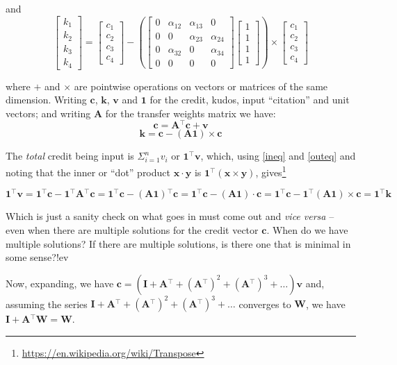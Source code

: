 \documentclass{article}
\newcommand{\cb}{\bm{c}}
\newcommand{\kb}{\bm{k}}
\newcommand{\A}{\bm{A}}
\newcommand{\I}{\bm{I}}
\newcommand{\one}{\bm{1}}
\newcommand{\vb}{\bm{v}}
\newcommand{\W}{\bm{W}}
\newcommand{\tp}[1]{#1\!^{\top}}
\newcommand{\AT}{\tp{\A}}
\begin{document}
and
\[
\left[
  \begin{array}{c}
    k_1 \\ k_2 \\ k_3 \\ k_4
  \end{array}
  \right]
=
\left[
  \begin{array}{c}
    c_1 \\ c_2 \\ c_3 \\ c_4
  \end{array}
  \right]
-
\left(\left[
  \begin{array}{cccc}
    0     & \alpha_{12} & \alpha_{13}  & 0          \\
    0     & 0          & \alpha_{23}  & \alpha_{24} \\
    0     & \alpha_{32} & 0           & \alpha_{34} \\
    0     & 0          & 0           & 0           
  \end{array}
  \right]
\left[
  \begin{array}{c}
    1 \\ 1 \\ 1 \\ 1
  \end{array}
  \right]
\right)
\times
\left[
  \begin{array}{c}
    c_1 \\ c_2 \\ c_3 \\ c_4
  \end{array}
  \right]
\]




where $+$ and $\times$ are pointwise operations on vectors or matrices
of the same dimension. Writing $\cb$, $\kb$, $\vb$ and $\one$ for the credit, kudos, input
``citation'' and unit vectors; and writing $\A$ for the transfer weights matrix  we have:
% 
\begin{equation}\label{ineq}
  \cb = \AT\cb+\vb
\end{equation}
% 
\begin{equation}\label{outeq}
  \kb = \cb - (\A\one)\times\cb
\end{equation}

The {\em total} credit being input is $\Sigma_{i=1}^nv_i$ or
$\tp{\one}\vb$, which, using \ref{ineq} and \ref{outeq} and noting
that the inner or ``dot'' product $\bm{x}\cdot\bm{y}$ is
$\tp{\one}(\bm{x}\times\bm{y})$, gives\footnote{\url{https://en.wikipedia.org/wiki/Transpose}}

\[
\tp{\one}\vb = \tp{\one}\cb - \tp{\one}\AT\cb =
\tp{\one}\cb -\tp{(\A\one)}\cb = \tp{\one}\cb - (\A\one)\cdot \cb =
\tp{\one}\cb - \tp{\one}(\A\one)\times\cb = \tp{\one}\kb
\]

Which is just a sanity check on what goes in must come out and {\em
  vice versa} -- even
when there are multiple solutions for the credit vector $\cb$. When do
we have multiple solutions?  If there are multiple solutions, is there
one that is minimal in some sense?!ev


Now, expanding, we have $\cb = (\I + \AT + (\AT)^2 + (\AT)^3 + \ldots)\vb$ and,
assuming the series  $\I + \AT + (\AT)^2 + (\AT)^3 + \ldots$ converges to
$\W$, we have $\I +\AT\W = \W$. 
\end{document}
